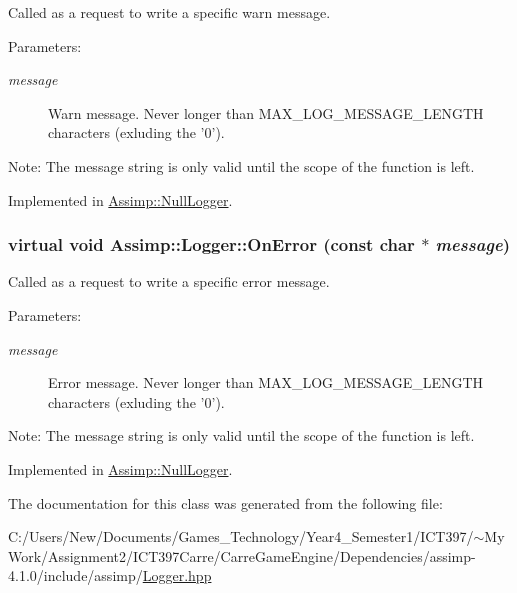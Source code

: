 Called as a request to write a specific warn message. 

\begin{Desc}
\item[Parameters:]
\begin{description}
\item[{\em message}]Warn message. Never longer than MAX\_\-LOG\_\-MESSAGE\_\-LENGTH characters (exluding the '0'). \end{description}
\end{Desc}
\begin{Desc}
\item[Note:]The message string is only valid until the scope of the function is left. \end{Desc}


Implemented in \hyperlink{class_assimp_1_1_null_logger_9a04c2b9e3d4bc9eec8f693ed8115f24}{Assimp::NullLogger}.\hypertarget{class_assimp_1_1_logger_e2ea0790aba6125b90af0f2768b0759d}{
\subsubsection[OnError]{\setlength{\rightskip}{0pt plus 5cm}virtual void Assimp::Logger::OnError (const char $\ast$ {\em message})}}
\label{class_assimp_1_1_logger_e2ea0790aba6125b90af0f2768b0759d}


Called as a request to write a specific error message. 

\begin{Desc}
\item[Parameters:]
\begin{description}
\item[{\em message}]Error message. Never longer than MAX\_\-LOG\_\-MESSAGE\_\-LENGTH characters (exluding the '0'). \end{description}
\end{Desc}
\begin{Desc}
\item[Note:]The message string is only valid until the scope of the function is left. \end{Desc}


Implemented in \hyperlink{class_assimp_1_1_null_logger_4fbf66103757fafcff891fb04b4ee714}{Assimp::NullLogger}.

The documentation for this class was generated from the following file:\begin{CompactItemize}
\item 
C:/Users/New/Documents/Games\_\-Technology/Year4\_\-Semester1/ICT397/$\sim$My Work/Assignment2/ICT397Carre/CarreGameEngine/Dependencies/assimp-4.1.0/include/assimp/\hyperlink{_logger_8hpp}{Logger.hpp}\end{CompactItemize}
